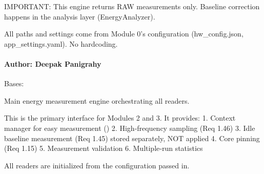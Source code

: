 \documentclass[letterpaper,10pt,english]{sphinxmanual}
\begin{document}
\sphinxAtStartPar
IMPORTANT: This engine returns RAW measurements only.
Baseline correction happens in the analysis layer (EnergyAnalyzer).

\sphinxAtStartPar
All paths and settings come from Module 0’s configuration (hw\_config.json,
app\_settings.yaml). No hardcoding.


\paragraph{Author: Deepak Panigrahy}
\label{\detokenize{core.energy_engine:author-deepak-panigrahy}}

\begin{fulllineitems}
\label{\detokenize{core.energy_engine:core.energy_engine.EnergyEngine}}
\pysigstartsignatures
\pysiglinewithargsret
{}
{}
{}
\pysigstopsignatures
\sphinxAtStartPar
Bases: 

\sphinxAtStartPar
Main energy measurement engine orchestrating all readers.

\sphinxAtStartPar
This is the primary interface for Modules 2 and 3. It provides:
1. Context manager for easy measurement ()
2. High‑frequency sampling (Req 1.46)
3. Idle baseline measurement (Req 1.45) \textendash{} stored separately, NOT applied
4. Core pinning (Req 1.15)
5. Measurement validation
6. Multiple‑run statistics

\sphinxAtStartPar
All readers are initialized from the configuration passed in.


\end{fulllineitems}
\end{document}
